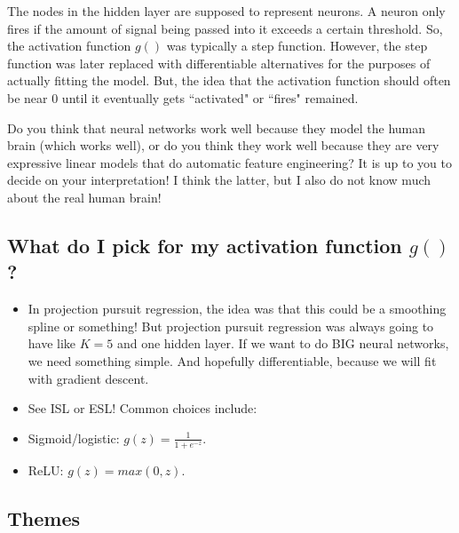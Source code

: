The nodes in the hidden layer are supposed to represent neurons. A neuron only fires if the amount of signal being passed into it exceeds a certain threshold. So, the activation function $g()$ was typically a step function. However, the step function was later replaced with differentiable alternatives for the purposes of actually fitting the model. But, the idea that the activation function should often be near 0 until it eventually gets ``activated" or ``fires" remained. 

Do you think that neural networks work well because they model the human brain (which works well), or do you think they work well because they are very expressive linear models that do automatic feature engineering? It is up to you to decide on your interpretation! I think the latter, but I also do not know much about the real human brain! 


\subsection{What do I pick for my activation function $g()$?}
\begin{itemize}
\item In projection pursuit regression, the idea was that this could be a smoothing spline or something! But projection pursuit regression was always going to have like $K=5$ and one hidden layer. If we want to do BIG neural networks, we need something simple. And hopefully differentiable, because we will fit with gradient descent. 
\item See ISL or ESL! Common choices include: 
\item Sigmoid/logistic: $g(z) = \frac{1}{1+e^{-z}}$. 
\item ReLU: $g(z) = max(0,z)$. 
\end{itemize}





\subsection{Themes}

